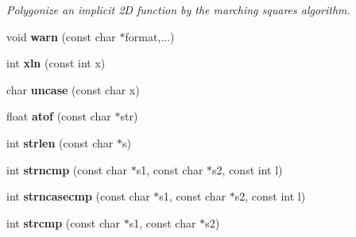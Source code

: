 \begin{DoxyCompactItemize}
\begin{DoxyCompactList}\small\item\em Polygonize an implicit 2\-D function by the marching squares algorithm. \end{DoxyCompactList}\item 
\hypertarget{namespacecimg__library_1_1cimg_a93ec28267b101050d949d1ebff1b88cf}{void {\bfseries warn} (const char $\ast$format,...)}\label{namespacecimg__library_1_1cimg_a93ec28267b101050d949d1ebff1b88cf}

\item 
\hypertarget{namespacecimg__library_1_1cimg_a8dde183be46c1821a3901b63825a4cf4}{int {\bfseries xln} (const int x)}\label{namespacecimg__library_1_1cimg_a8dde183be46c1821a3901b63825a4cf4}

\item 
\hypertarget{namespacecimg__library_1_1cimg_a5a028d4d4de4e1894263a29a6de8e2ee}{char {\bfseries uncase} (const char x)}\label{namespacecimg__library_1_1cimg_a5a028d4d4de4e1894263a29a6de8e2ee}

\item 
\hypertarget{namespacecimg__library_1_1cimg_a9351fb264b6bffb8d45141777a8099b5}{float {\bfseries atof} (const char $\ast$str)}\label{namespacecimg__library_1_1cimg_a9351fb264b6bffb8d45141777a8099b5}

\item 
\hypertarget{namespacecimg__library_1_1cimg_ad98b32d24a175c3d81024247660964b4}{int {\bfseries strlen} (const char $\ast$s)}\label{namespacecimg__library_1_1cimg_ad98b32d24a175c3d81024247660964b4}

\item 
\hypertarget{namespacecimg__library_1_1cimg_a605999871c7480ae5374eb7c22b36d2b}{int {\bfseries strncmp} (const char $\ast$s1, const char $\ast$s2, const int l)}\label{namespacecimg__library_1_1cimg_a605999871c7480ae5374eb7c22b36d2b}

\item 
\hypertarget{namespacecimg__library_1_1cimg_aeafd7eca641a77ede586f28ca2f224ec}{int {\bfseries strncasecmp} (const char $\ast$s1, const char $\ast$s2, const int l)}\label{namespacecimg__library_1_1cimg_aeafd7eca641a77ede586f28ca2f224ec}

\item 
\hypertarget{namespacecimg__library_1_1cimg_aa023adc89abf37f3b1c641c3074888cd}{int {\bfseries strcmp} (const char $\ast$s1, const char $\ast$s2)}\label{namespacecimg__library_1_1cimg_aa023adc89abf37f3b1c641c3074888cd}


\end{DoxyCompactItemize}
